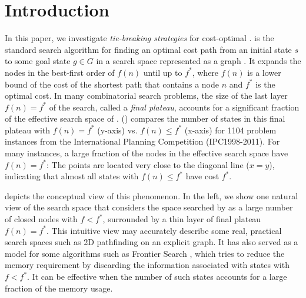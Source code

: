 
\section{Introduction}
\label{sec:introduction}

In this paper, we investigate \emph{tie-breaking strategies} for cost-optimal \astar.
\astar is the standard search algorithm for finding an optimal cost path from an initial state $s$ to some goal
state $g \in G$ in a search space represented as a graph \cite{hart1968formal}.
It expands the nodes in the best-first order of $f(n)$ until up to $f^*$,
where $f(n)$ is a lower bound of the cost of the shortest path that contains a node $n$ and $f^*$ is the optimal cost.
% 
In many combinatorial search problems, the size of the last layer $f(n)=f^*$ of the search, called a \emph{final plateau},
accounts for a significant fraction of the effective search space of \astar.  
() compares the number of states in this final plateau with $f(n) = f^*$ (y-axis)
vs. $f(n) \leq f^*$ (x-axis) for 1104 problem instances from the International Planning Competition (IPC1998-2011).
For many instances, a large fraction of the nodes in the effective search space have $f(n)=f^*$: The points
are located very close to the diagonal line ($x=y$), indicating that almost all states with $f(n) \leq f^*$ have cost
$f^*$.

 depicts the conceptual view of this phenomenon.
% 
In the left, we show 
one natural  %
view of the search space that considers the space searched by \astar as
a large number of closed nodes with $f<f^*$, surrounded by
a thin layer of final plateau $f(n)=f^*$.  This intuitive view
may accurately describe some real, practical search spaces such as 2D pathfinding on an explicit
graph.
% 
It has also served as a model for some algorithms such as Frontier Search \cite{korf1999divide,korf2000divide},
which tries to reduce the memory requirement by discarding the information associated with states with $f<f^*$.
It can be effective when the number of such states accounts for a large fraction of the memory usage.
 
